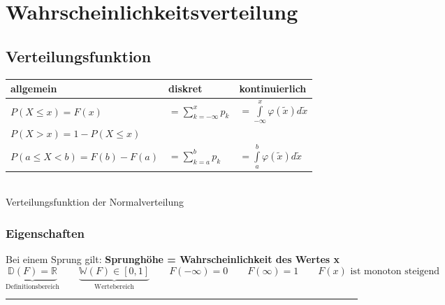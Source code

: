 \section{Wahrscheinlichkeitsverteilung}

\subsection{Verteilungsfunktion}
\begin{minipage}{0.6\textwidth}
	\begin{tabular}{|l|l|l|}
		\hline
		\textbf{allgemein} & \textbf{diskret} & \textbf{kontinuierlich}\\
		\hline
		\hline
		$P(X\leq x)=F(x)$ & $=\sum\limits_{k=-\infty}^x p_k$ &
		$=\int\limits_{-\infty}^x \varphi(\tilde{x})d\tilde{x}$\\
		
		$P(X>x)=1-P(X\leq x)$ & & \\        	
		$P(a \le X < b)=F(b)-F(a)$ & $=\sum\limits_{k=a}^b p_k$ &
		$=\int \limits_a^b \varphi(\tilde{x})d\tilde{x}$\\
		\hline
	\end{tabular}
\end{minipage}
\begin{minipage}{0.4\textwidth}
	\\
	Verteilungsfunktion der Normalverteilung
\end{minipage}


\subsubsection{Eigenschaften}
Bei einem Sprung gilt: \textbf{Sprunghöhe = Wahrscheinlichkeit des Wertes x}\\
$$\underbrace{\boxed{\mathbb{D}(F) = \mathbb{R}}}_{\text{Definitionsbereich}} \qquad \underbrace{\boxed{\mathbb{W}(F) \in[0,1]}}_{\text{Wertebereich}} \qquad \boxed{F(-\infty)=0} \qquad  \boxed{F(\infty)=1}
\qquad \boxed{F(x) \text{ ist monoton steigend}}$$

\hrule


